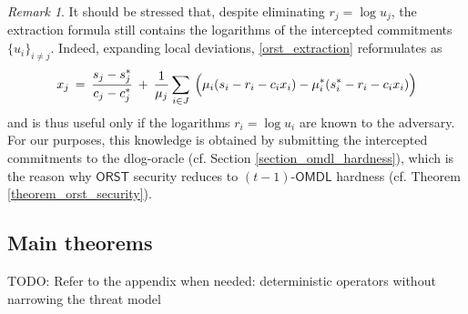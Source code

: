\documentclass[psamsfonts, reqno]{amsart}
\theoremstyle{definition}
\theoremstyle{remark}
\newtheorem{rem}[thm]{Remark}
\numberwithin{equation}{section}
\begin{document}
\begin{rem}\label{remark_extraction}
It should be stressed that, despite eliminating
$r_j = \log u_j$,
the extraction formula still
contains the logarithms of
the intercepted commitments $\{u_i\}_{i \neq j}$.
Indeed, expanding local deviations,
\eqref{orst_extraction} reformulates as
\vspace{5pt}
\begin{equation}\label{orst_extraction_analytical}
x_j
\hspace{2pt}
=
\hspace{2pt}
\frac{s_j - s_j^*}{c_j - c_j^*}
\hspace{2pt}
+
\hspace{2pt}
\frac{1}{\mu_j} \sum_{i \in J}
\hspace{2pt}
\Big(
	\mu_i (s_i - r_i - c_i x_i) -
	\mu_i^* (s_i^* - r_i - c_i x_i)
\Big)
\vspace{5pt}
\end{equation}
and is thus useful only if
the logarithms $r_i = \log u_i$ are known
to the adversary.
For our purposes,
this knowledge is obtained by submitting
the intercepted commitments
to the dlog-oracle
(cf. Section \ref{section_omdl_hardness}),
which is the reason why $\mathsf{ORST}$ security
reduces to
$(t-1)$-$\mathsf{OMDL}$ hardness
(cf. Theorem \ref{theorem_orst_security}).
\end{rem}

\subsection{Main theorems}\label{section_main_theorems}

\noindent
TODO: Refer to the appendix when needed:
deterministic operators without narrowing the threat model
\end{document}
